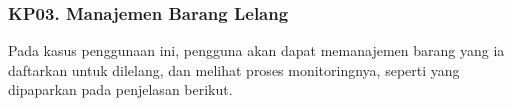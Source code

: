 \subsubsection{KP03. Manajemen Barang Lelang}
\label{kp03}

Pada kasus penggunaan ini, pengguna akan dapat memanajemen barang yang ia daftarkan untuk dilelang, dan melihat proses monitoringnya, seperti yang dipaparkan pada penjelasan berikut.\\







